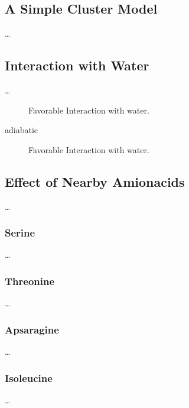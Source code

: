 \subsection{A Simple Cluster Model}\fi
\ldots

\subsection{Interaction with Water}
\ldots
\begin{figure}[th!]
    \centering
    \small
    
    \caption[Short caption for Table of Figures]{Favorable Interaction with water.}
    \label{fig:scan_H}
\end{figure}
adiabatic

\begin{figure}[th!]
    \centering
    \small
    
    \caption[Short caption for Table of Figures]{Favorable Interaction with water.}
    \label{fig:scan_X}
\end{figure}

\subsection{Effect of Nearby Amionacids}
\ldots

\subsubsection{Serine}
\ldots
\subsubsection{Threonine}
\ldots
\subsubsection{Apsaragine}
\ldots
\subsubsection{Isoleucine}
\ldots

\cleardoublepage

